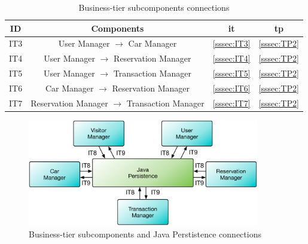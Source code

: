 \begin{table}[htbp]
\begin{center}
\begin{tabular}[t]{cccc}

\hline
\textbf{ID} & \textbf{Components} & \textbf{\acs{it}} & \textbf{\acs{tp}}\\
\hline
IT3 & \enspace User Manager $\rightarrow$ Car Manager \enspace & \ref{sssec:IT3} & \ref{sssec:TP2}\\
\hline
IT4 & \enspace User Manager $\rightarrow$ Reservation Manager \enspace & \ref{sssec:IT4} & \ref{sssec:TP2}\\
\hline
IT5 & \enspace User Manager $\rightarrow$ Transaction Manager \enspace & \ref{sssec:IT5} & \ref{sssec:TP2}\\
\hline
IT6 & \enspace Car Manager $\rightarrow$ Reservation Manager \enspace & \ref{sssec:IT6} & \ref{sssec:TP2}\\
\hline
IT7 & \enspace Reservation Manager $\rightarrow$ Transaction Manager \enspace & \ref{sssec:IT7} & \ref{sssec:TP2}\\
\hline


\end{tabular}
\caption{Business-tier subcomponents connections}
\end{center}
\end{table}

\clearpage

\begin{figure}[htbp]
\centering
\includegraphics[width=0.9\textwidth]{Images/IT8-9-.pdf}
\vspace{16pt}
\caption{Business-tier subcomponents and Java Perstistence connections}
\label{fig:it8-9}
\end{figure}

